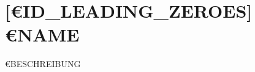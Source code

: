 \documentclass[../list/inventory_full.tex]{subfiles}
\begin{document}

\section*{[€{ID_LEADING_ZEROES}] €{NAME}}
€{BESCHREIBUNG}
\end{document}
